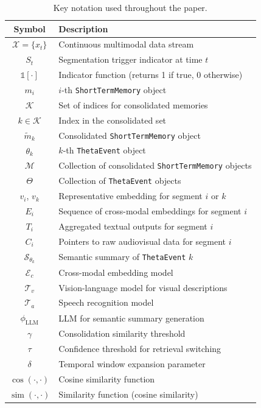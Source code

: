 \begin{table}[h]
\centering
\caption{Key notation used throughout the paper.}
\label{tab:notation}
\begin{tabular}{@{}cl@{}}
\toprule
\textbf{Symbol} & \textbf{Description} \\
\midrule
$\mathcal{X} = \{x_t\}$ & Continuous multimodal data stream \\
$S_t$ & Segmentation trigger indicator at time $t$ \\
$\mathds{1}[\cdot]$ & Indicator function (returns 1 if true, 0 otherwise) \\
$m_i$ & $i$-th \texttt{ShortTermMemory} object \\
$\mathcal{K}$ & Set of indices for consolidated memories \\
$k \in \mathcal{K}$ & Index in the consolidated set \\
$\tilde{m}_k$ & Consolidated \texttt{ShortTermMemory} object \\
$\theta_k$ & $k$-th \texttt{ThetaEvent} object \\
$\mathcal{M}$ & Collection of consolidated \texttt{ShortTermMemory} objects \\
$\Theta$ & Collection of \texttt{ThetaEvent} objects \\
$v_i$, $v_k$ & Representative embedding for segment $i$ or $k$ \\
$E_i$ & Sequence of cross-modal embeddings for segment $i$ \\
$T_i$ & Aggregated textual outputs for segment $i$ \\
$C_i$ & Pointers to raw audiovisual data for segment $i$ \\
$\mathcal{S}_{\theta_k}$ & Semantic summary of \texttt{ThetaEvent} $k$ \\
$\mathcal{E}_c$ & Cross-modal embedding model \\
$\mathcal{T}_v$ & Vision-language model for visual descriptions \\
$\mathcal{T}_a$ & Speech recognition model \\
$\phi_{\text{LLM}}$ & LLM for semantic summary generation \\
$\gamma$ & Consolidation similarity threshold \\
$\tau$ & Confidence threshold for retrieval switching \\
$\delta$ & Temporal window expansion parameter \\
$\cos(\cdot, \cdot)$ & Cosine similarity function \\
$\operatorname{sim}(\cdot, \cdot)$ & Similarity function (cosine similarity) \\

\end{tabular}
\end{table}
